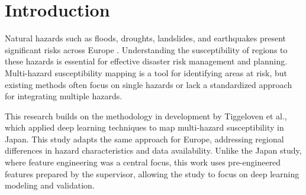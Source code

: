 \section{Introduction}
\label{sec:introduction}



Natural hazards such as floods, droughts, landslides, and earthquakes present significant risks across Europe \cite{EU}. Understanding the susceptibility of regions to these hazards is essential for effective disaster risk management and planning. Multi-hazard susceptibility mapping is a tool for identifying areas at risk, but existing methods often focus on single hazards or lack a standardized approach for integrating multiple hazards.

This research builds on the methodology in development by Tiggeloven et al., which applied deep learning techniques to map multi-hazard susceptibility in Japan. This study adapts the same approach for Europe, addressing regional differences in hazard characteristics and data availability. Unlike the Japan study, where feature engineering was a central focus, this work uses pre-engineered features prepared by the supervisor, allowing the study to focus on deep learning modeling and validation.

